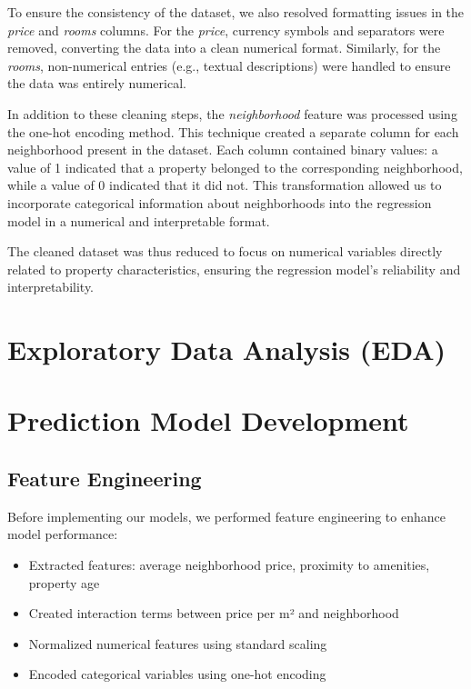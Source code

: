 \documentclass[twocolumn]{article}
\begin{document}
To ensure the consistency of the dataset, we also resolved formatting issues in the \textit{price} and \textit{rooms} columns. For the \textit{price}, currency symbols and separators were removed, converting the data into a clean numerical format. Similarly, for the \textit{rooms}, non-numerical entries (e.g., textual descriptions) were handled to ensure the data was entirely numerical.

In addition to these cleaning steps, the \textit{neighborhood} feature was processed using the one-hot encoding method. This technique created a separate column for each neighborhood present in the dataset. Each column contained binary values: a value of 1 indicated that a property belonged to the corresponding neighborhood, while a value of 0 indicated that it did not. This transformation allowed us to incorporate categorical information about neighborhoods into the regression model in a numerical and interpretable format.

The cleaned dataset was thus reduced to focus on numerical variables directly related to property characteristics, ensuring the regression model's reliability and interpretability.


\section{Exploratory Data Analysis (EDA)}

\section{Prediction Model Development}

\subsection{Feature Engineering}
Before implementing our models, we performed feature engineering to enhance model performance:
\begin{itemize}
    \item Extracted features: average neighborhood price, proximity to amenities, property age
    \item Created interaction terms between price per m² and neighborhood
    \item Normalized numerical features using standard scaling
    \item Encoded categorical variables using one-hot encoding
\end{itemize}
\end{document}
